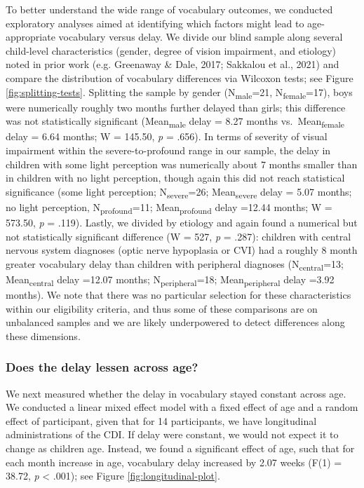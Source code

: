 \documentclass[
  man,floatsintext]{apa6}
\begin{document}
To better understand the wide range of vocabulary outcomes, we conducted exploratory analyses aimed at identifying which factors might lead to age-appropriate vocabulary versus delay. We divide our blind sample along several child-level characteristics (gender, degree of vision impairment, and etiology) noted in prior work (e.g. Greenaway \& Dale, 2017; Sakkalou et al., 2021) and compare the distribution of vocabulary differences via Wilcoxon tests; see Figure \ref{fig:splitting-tests}. Splitting the sample by gender (N\textsubscript{male}=21, N\textsubscript{female}=17), boys were numerically roughly two months further delayed than girls; this difference was not statistically significant (Mean\textsubscript{male} delay = 8.27 months vs.~Mean\textsubscript{female} delay = 6.64 months; W = 145.50, \emph{p} = .656). In terms of severity of visual impairment within the severe-to-profound range in our sample, the delay in children with some light perception was numerically about 7 months smaller than in children with no light perception, though again this did not reach statistical significance (some light perception; N\textsubscript{severe}=26; Mean\textsubscript{severe} delay = 5.07 months; no light perception, N\textsubscript{profound}=11; Mean\textsubscript{profound} delay =12.44 months; W = 573.50, \emph{p} = .119). Lastly, we divided by etiology and again found a numerical but not statistically significant difference (W = 527, \emph{p} = .287): children with central nervous system diagnoses (optic nerve hypoplasia or CVI) had a roughly 8 month greater vocabulary delay than children with peripheral diagnoses (N\textsubscript{central}=13; Mean\textsubscript{central} delay =12.07 months; N\textsubscript{peripheral}=18; Mean\textsubscript{peripheral} delay =3.92 months). We note that there was no particular selection for these characteristics within our eligibility criteria, and thus some of these comparisons are on unbalanced samples and we are likely underpowered to detect differences along these dimensions.

\hypertarget{does-the-delay-lessen-across-age}{%
\subsubsection{Does the delay lessen across age?}\label{does-the-delay-lessen-across-age}}

We next measured whether the delay in vocabulary stayed constant across age. We conducted a linear mixed effect model with a fixed effect of age and a random effect of participant, given that for 14 participants, we have longitudinal administrations of the CDI. If delay were constant, we would not expect it to change as children age. Instead, we found a significant effect of age, such that for each month increase in age, vocabulary delay increased by 2.07 weeks (F(1) = 38.72, \emph{p} \textless{} .001); see Figure \ref{fig:longitudinal-plot}.
\end{document}
